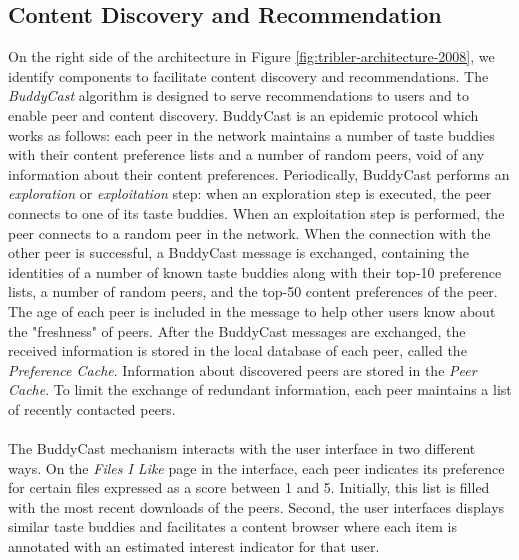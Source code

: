 \subsection{Content Discovery and Recommendation}
On the right side of the architecture in Figure \ref{fig:tribler-architecture-2008}, we identify components to facilitate content discovery and recommendations. The \emph{BuddyCast} algorithm is designed to serve recommendations to users and to enable peer and content discovery. BuddyCast is an epidemic protocol which works as follows: each peer in the network maintains a number of taste buddies with their content preference lists and a number of random peers, void of any information about their content preferences. Periodically, BuddyCast performs an \emph{exploration} or \emph{exploitation} step: when an exploration step is executed, the peer connects to one of its taste buddies. When an exploitation step is performed, the peer connects to a random peer in the network. When the connection with the other peer is successful, a BuddyCast message is exchanged, containing the identities of a number of known taste buddies along with their top-10 preference lists, a number of random peers, and the top-50 content preferences of the peer. The age of each peer is included in the message to help other users know about the "freshness" of peers. After the BuddyCast messages are exchanged, the received information is stored in the local database of each peer, called the \emph{Preference Cache}. Information about discovered peers are stored in the \emph{Peer Cache}. To limit the exchange of redundant information, each peer maintains a list of recently contacted peers.\\\\
The BuddyCast mechanism interacts with the user interface in two different ways. On the \emph{Files I Like} page in the interface, each peer indicates its preference for certain files expressed as a score between 1 and 5. Initially, this list is filled with the most recent downloads of the peers. Second, the user interfaces displays similar taste buddies and facilitates a content browser where each item is annotated with an estimated interest indicator for that user.

